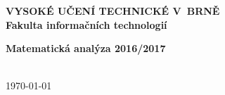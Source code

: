 \begin{titlepage}
	\centering

	{\fontsize{20pt}{15pt}\bfseries 
		VYSOKÉ UČENÍ TECHNICKÉ V~BRNĚ\\
		\vspace{8pt}
		Fakulta informačních technologií
	}

	\vspace*{64pt}

	\begin{figure}[H]
		\centering
		 
	\end{figure}

	\vspace*{\fill}

	{\LARGE \bfseries Matematická analýza 2016/2017\\}
	\vspace*{4pt}
	{\Large \thetitle}

	\vspace*{64pt}

	{\Large \theauthor\\}
	\vspace*{64pt}
	{\Large \today}

\end{titlepage}